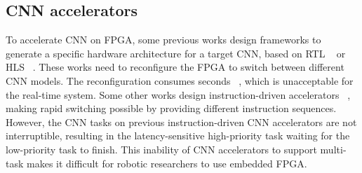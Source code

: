 \subsection{ CNN accelerators }

To accelerate CNN on FPGA, some previous works design frameworks to generate a specific hardware architecture for a target CNN, based on  RTL  ~\cite{li_high_2016} or HLS  ~\cite{lu_evaluating_2017}. These works need to reconfigure the FPGA to switch between different CNN models. The reconfiguration consumes seconds  ~\cite{FPGAPerformance}, which is unacceptable for the real-time system.
Some other works design instruction-driven accelerators  ~\cite{yu2018instruction,qiu2016going,guo2017angel,dpu}, making rapid switching possible by providing different instruction sequences. 
However, the CNN tasks on previous instruction-driven CNN accelerators are not interruptible, resulting in the latency-sensitive high-priority task waiting for the low-priority task to finish. 
This inability of CNN accelerators to support multi-task makes it difficult for robotic researchers to use embedded FPGA.


